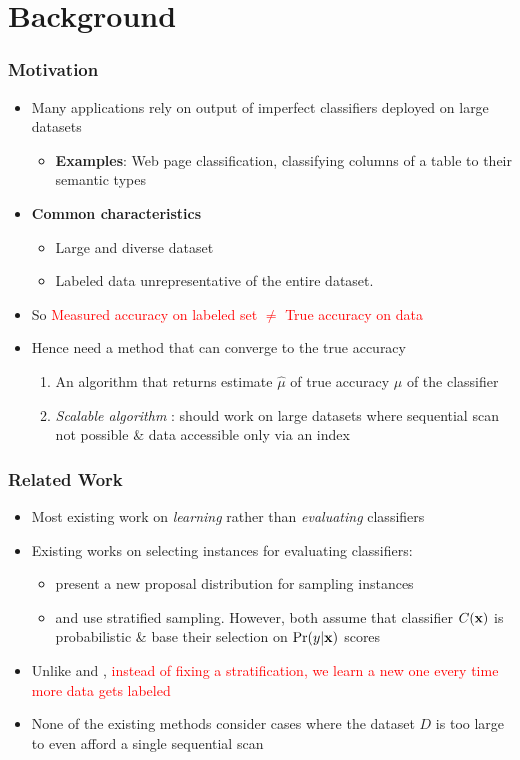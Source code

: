 \documentclass[11pt]{beamer}
\newcommand{\vek}[1]{{\bf {#1}}}
\newcommand{\vx}{{\vek{x}}}
\newlength{\wideitemsep}
\let\olditem\item
\renewcommand{\item}{\setlength{\itemsep}{\wideitemsep}\olditem}
\begin{document}
\section{Background}
\begin{frame}
\frametitle{Motivation}
\begin{itemize}
\item Many applications rely on output of imperfect classifiers deployed on large datasets \\ 
\begin{itemize}
\item \textbf{Examples}: Web page classification, classifying columns of a table to their semantic types
\end{itemize}
\item \textbf{Common characteristics} 
\begin{itemize}
\item Large and diverse dataset 
\item Labeled data unrepresentative of the entire dataset. 
\end{itemize}
\item So \textcolor{red}{Measured accuracy on labeled set $\neq$ True accuracy on data}
\item Hence need a method that can converge to the true accuracy
\begin{enumerate}
\item An algorithm that returns estimate $\hat{\mu}$ of true accuracy $\mu$ of the classifier
\item \textit{Scalable algorithm} : should work on large datasets where sequential scan not possible \& data accessible only via an index
\end{enumerate} 
\end{itemize}
\end{frame}

\begin{frame}
\frametitle{Related Work}
\begin{itemize}
\item Most existing work on \textit{learning} rather than \textit{evaluating} classifiers
\item Existing works on selecting instances for evaluating classifiers:
\begin{itemize}
\item \citep{sawade10} present a new proposal distribution for sampling instances
\item \citep{bennett10} and \citep{druck11} use stratified sampling. However, both assume that classifier $C(\vx)$ is probabilistic \& base their selection on $\Pr(y|\vx)$ scores
\end{itemize}
\item Unlike \citep{bennett10} and \citep{druck11}, \textcolor{red}{instead of fixing a stratification, we learn a new one every time more data gets labeled}
\item None of the existing methods consider cases where the dataset $D$ is too large to even afford a single sequential scan %
\end{itemize}
\end{frame}
\end{document}
